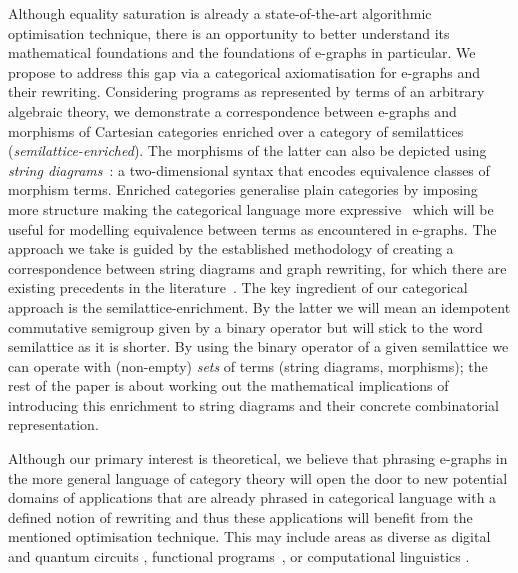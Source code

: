 Although equality saturation is already a state-of-the-art algorithmic optimisation technique, there is an opportunity to better understand its mathematical foundations and the foundations of e-graphs in particular.
We propose to address this gap via a categorical axiomatisation for e-graphs and their rewriting.
Considering programs as represented by terms of an arbitrary algebraic theory, we demonstrate a correspondence between e-graphs and morphisms of Cartesian categories enriched over a category of semilattices (\textit{semilattice-enriched}).
The morphisms of the latter can also be depicted using \emph{string diagrams}~\cite{Selinger_2010,joyal_geometry_1991, mellies_functorial_2006}: a two-dimensional syntax that encodes equivalence classes of morphism terms.
Enriched categories generalise plain categories by imposing more structure making the categorical language more expressive~\cite{Borceux_1994,Kelly2022BASICCO} which will be useful for modelling equivalence between terms as encountered in e-graphs.
The approach we take is guided by the established methodology of creating a correspondence between string diagrams and graph rewriting, for which there are existing precedents in the literature~\cite{bonchi_string_2022,bonchi_string_2022-1,bonchi_string_2022-2,ghica_rewriting_2023,ghica_hierarchical_2023}.
The key ingredient of our categorical approach is the semilattice-enrichment.
By the latter we will mean an idempotent commutative semigroup given by a binary operator but will stick to the word semilattice as it is shorter.
By using the binary operator of a given semilattice we can operate with (non-empty) \textit{sets} of terms (string diagrams, morphisms); the rest of the paper is about working out the mathematical implications of introducing this enrichment to string diagrams and their concrete combinatorial representation.

Although our primary interest is theoretical, we believe that phrasing e-graphs in the more general language of category theory will open the door to new potential domains of applications that are already phrased in categorical language with a defined notion of rewriting and thus these applications will benefit from the mentioned optimisation technique.
This may include areas as diverse as digital \cite{ghica_compositional_2023} and quantum circuits
\cite{coecke_interacting_2011,ZX}, functional programs~\cite{ghica-zanassi2023string}, or computational linguistics \cite{wazni_quantum_2022,coecke_lambek_2013}.

